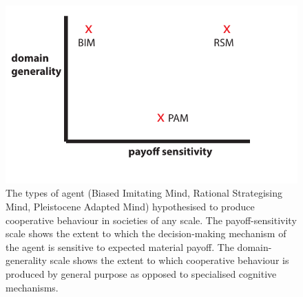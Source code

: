 \documentclass[10pt, a4paper, fleqn]{article}
\begin{document}
\newpage

               


\clearpage
 \begin{figure}
 \centering
 \includegraphics[scale=1]{Fig2}
 \caption{The types of agent (Biased Imitating Mind, Rational Strategising Mind, Pleistocene Adapted Mind) hypothesised to produce cooperative behaviour in societies of any scale. The payoff-sensitivity scale shows the extent to which the decision-making mechanism of the agent is sensitive to expected material payoff. The domain-generality scale shows the extent to which cooperative behaviour is produced by general purpose as opposed to specialised cognitive mechanisms. }
 \end{figure}
\end{document}
